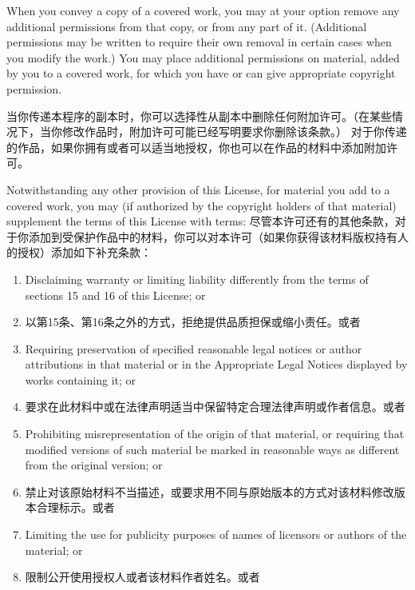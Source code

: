 \documentclass[11pt]{article}
\begin{document}
\begin{enumerate}
When you convey a copy of a covered work, you may at your option
remove any additional permissions from that copy, or from any part of
it.  (Additional permissions may be written to require their own
removal in certain cases when you modify the work.)  You may place
additional permissions on material, added by you to a covered work,
for which you have or can give appropriate copyright permission.

当你传递本程序的副本时，你可以选择性从副本中删除任何附加许可。（在某些情况下，当你修改作品时，附加许可可能已经写明要求你删除该条款。）
对于你传递的作品，如果你拥有或者可以适当地授权，你也可以在作品的材料中添加附加许可。

Notwithstanding any other provision of this License, for material you
add to a covered work, you may (if authorized by the copyright holders of
that material) supplement the terms of this License with terms:
尽管本许可还有的其他条款，对于你添加到受保护作品中的材料，你可以对本许可（如果你获得该材料版权持有人的授权）添加如下补充条款：
  \begin{enumerate}
  \item Disclaiming warranty or limiting liability differently from the
  terms of sections 15 and 16 of this License; or
  \item 以第15条、第16条之外的方式，拒绝提供品质担保或缩小责任。或者

  \item Requiring preservation of specified reasonable legal notices or
  author attributions in that material or in the Appropriate Legal
  Notices displayed by works containing it; or

  \item 要求在此材料中或在法律声明适当中保留特定合理法律声明或作者信息。或者
  
  \item Prohibiting misrepresentation of the origin of that material, or
  requiring that modified versions of such material be marked in
  reasonable ways as different from the original version; or

  \item 禁止对该原始材料不当描述，或要求用不同与原始版本的方式对该材料修改版本合理标示。或者

  \item Limiting the use for publicity purposes of names of licensors or
  authors of the material; or

  \item 限制公开使用授权人或者该材料作者姓名。或者


\end{enumerate}
\end{enumerate}
\end{document}
